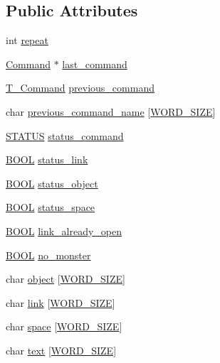 \subsection*{Public Attributes}
\begin{DoxyCompactItemize}
\item 
int \hyperlink{struct__Dialogue_a36b7548a4853c80dd35fe7feb6e21252}{repeat}
\item 
\hyperlink{command_8h_a7d2935971c252377cb0fc1c8545dc2bc}{Command} $\ast$ \hyperlink{struct__Dialogue_ad4340f1881243b083535594a283a864b}{last\+\_\+command}
\item 
\hyperlink{command_8h_a0473597db8c45c0289b6b8e2f8abbe32}{T\+\_\+\+Command} \hyperlink{struct__Dialogue_a5916cc0658d2489b07e4c07d1af9029f}{previous\+\_\+command}
\item 
char \hyperlink{struct__Dialogue_a469e24b5ab5ee38a4219889a45c607a0}{previous\+\_\+command\+\_\+name} \mbox{[}\hyperlink{types_8h_a92ed8507d1cd2331ad09275c5c4c1c89}{W\+O\+R\+D\+\_\+\+S\+I\+Z\+E}\mbox{]}
\item 
\hyperlink{types_8h_a32c27cc471df37f4fc818d65de0a56c4}{S\+T\+A\+T\+U\+S} \hyperlink{struct__Dialogue_af479d1df9a92c3233bfaaa3dd332520e}{status\+\_\+command}
\item 
\hyperlink{types_8h_a3e5b8192e7d9ffaf3542f1210aec18dd}{B\+O\+O\+L} \hyperlink{struct__Dialogue_a273106296bef7851f910cbd8ace3c16d}{status\+\_\+link}
\item 
\hyperlink{types_8h_a3e5b8192e7d9ffaf3542f1210aec18dd}{B\+O\+O\+L} \hyperlink{struct__Dialogue_a877e735a7c75ad25838756e50ca8341e}{status\+\_\+object}
\item 
\hyperlink{types_8h_a3e5b8192e7d9ffaf3542f1210aec18dd}{B\+O\+O\+L} \hyperlink{struct__Dialogue_aef9641ab92321bf3b59362c8cbb5dad1}{status\+\_\+space}
\item 
\hyperlink{types_8h_a3e5b8192e7d9ffaf3542f1210aec18dd}{B\+O\+O\+L} \hyperlink{struct__Dialogue_a2334a9bb36055478553f576db1c91a54}{link\+\_\+already\+\_\+open}
\item 
\hyperlink{types_8h_a3e5b8192e7d9ffaf3542f1210aec18dd}{B\+O\+O\+L} \hyperlink{struct__Dialogue_ab41d3ec815fc544944f1edb5e9f158a6}{no\+\_\+monster}
\item 
char \hyperlink{struct__Dialogue_a423dddb02d061194426cdde84f1ccf95}{object} \mbox{[}\hyperlink{types_8h_a92ed8507d1cd2331ad09275c5c4c1c89}{W\+O\+R\+D\+\_\+\+S\+I\+Z\+E}\mbox{]}
\item 
char \hyperlink{struct__Dialogue_adfdfa42510a4f6bccc37d7250529574d}{link} \mbox{[}\hyperlink{types_8h_a92ed8507d1cd2331ad09275c5c4c1c89}{W\+O\+R\+D\+\_\+\+S\+I\+Z\+E}\mbox{]}
\item 
char \hyperlink{struct__Dialogue_a28fdc6bd5c84508d271bf9464245f731}{space} \mbox{[}\hyperlink{types_8h_a92ed8507d1cd2331ad09275c5c4c1c89}{W\+O\+R\+D\+\_\+\+S\+I\+Z\+E}\mbox{]}
\item 
char \hyperlink{struct__Dialogue_a6d5e37264cf94fb53c0eb66f796b5705}{text} \mbox{[}\hyperlink{types_8h_a92ed8507d1cd2331ad09275c5c4c1c89}{W\+O\+R\+D\+\_\+\+S\+I\+Z\+E}\mbox{]}
\end{DoxyCompactItemize}


